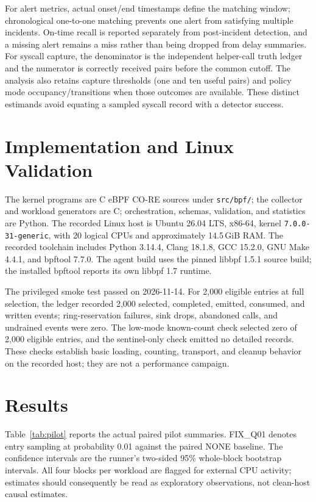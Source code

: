 \documentclass[conference]{IEEEtran}
\begin{document}
For alert metrics, actual onset/end timestamps define the matching window; chronological one-to-one matching prevents one alert from satisfying multiple incidents. On-time recall is reported separately from post-incident detection, and a missing alert remains a miss rather than being dropped from delay summaries. For syscall capture, the denominator is the independent helper-call truth ledger and the numerator is correctly received pairs before the common cutoff. The analysis also retains capture thresholds (one and ten useful pairs) and policy mode occupancy/transitions when those outcomes are available. These distinct estimands avoid equating a sampled syscall record with a detector success.

\section{Implementation and Linux Validation}
The kernel programs are C eBPF CO-RE sources under \texttt{src/bpf/}; the collector and workload generators are C; orchestration, schemas, validation, and statistics are Python. The recorded Linux host is Ubuntu 26.04 LTS, x86-64, kernel \texttt{7.0.0-31-generic}, with 20 logical CPUs and approximately 14.5\,GiB RAM. The recorded toolchain includes Python 3.14.4, Clang 18.1.8, GCC 15.2.0, GNU Make 4.4.1, and bpftool 7.7.0. The agent build uses the pinned libbpf 1.5.1 source build; the installed bpftool reports its own libbpf 1.7 runtime.

The privileged smoke test passed on 2026-11-14. For 2,000 eligible entries at full selection, the ledger recorded 2,000 selected, completed, emitted, consumed, and written events; ring-reservation failures, sink drops, abandoned calls, and undrained events were zero. The low-mode known-count check selected zero of 2,000 eligible entries, and the sentinel-only check emitted no detailed records. These checks establish basic loading, counting, transport, and cleanup behavior on the recorded host; they are not a performance campaign.

\section{Results}
Table~\ref{tab:pilot} reports the actual paired pilot summaries. FIX\_Q01 denotes entry sampling at probability 0.01 against the paired NONE baseline. The confidence intervals are the runner's two-sided 95\% whole-block bootstrap intervals. All four blocks per workload are flagged for external CPU activity; estimates should consequently be read as exploratory observations, not clean-host causal estimates.
\end{document}
